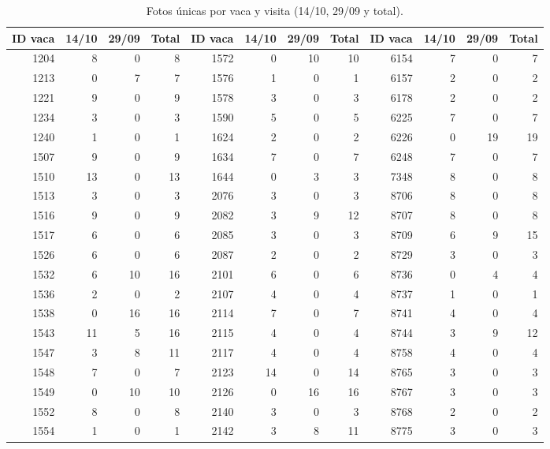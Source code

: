 \begin{table}[H]
  \centering
  \small
  \caption{Fotos únicas por vaca y visita (14/10, 29/09 y total).}
  \label{tab:fotos-por-vaca}
  \setlength{\tabcolsep}{4pt}
  \begin{tabular}{rrrr@{\hspace{1.5em}}rrrr@{\hspace{1.5em}}rrrr}
    \toprule
    ID vaca & 14/10 & 29/09 & Total & ID vaca & 14/10 & 29/09 & Total & ID vaca & 14/10 & 29/09 & Total \\
    \midrule
    1204 & 8 & 0 & 8 & 1572 & 0 & 10 & 10 & 6154 & 7 & 0 & 7 \\
    1213 & 0 & 7 & 7 & 1576 & 1 & 0 & 1 & 6157 & 2 & 0 & 2 \\
    1221 & 9 & 0 & 9 & 1578 & 3 & 0 & 3 & 6178 & 2 & 0 & 2 \\
    1234 & 3 & 0 & 3 & 1590 & 5 & 0 & 5 & 6225 & 7 & 0 & 7 \\
    1240 & 1 & 0 & 1 & 1624 & 2 & 0 & 2 & 6226 & 0 & 19 & 19 \\
    1507 & 9 & 0 & 9 & 1634 & 7 & 0 & 7 & 6248 & 7 & 0 & 7 \\
    1510 & 13 & 0 & 13 & 1644 & 0 & 3 & 3 & 7348 & 8 & 0 & 8 \\
    1513 & 3 & 0 & 3 & 2076 & 3 & 0 & 3 & 8706 & 8 & 0 & 8 \\
    1516 & 9 & 0 & 9 & 2082 & 3 & 9 & 12 & 8707 & 8 & 0 & 8 \\
    1517 & 6 & 0 & 6 & 2085 & 3 & 0 & 3 & 8709 & 6 & 9 & 15 \\
    1526 & 6 & 0 & 6 & 2087 & 2 & 0 & 2 & 8729 & 3 & 0 & 3 \\
    1532 & 6 & 10 & 16 & 2101 & 6 & 0 & 6 & 8736 & 0 & 4 & 4 \\
    1536 & 2 & 0 & 2 & 2107 & 4 & 0 & 4 & 8737 & 1 & 0 & 1 \\
    1538 & 0 & 16 & 16 & 2114 & 7 & 0 & 7 & 8741 & 4 & 0 & 4 \\
    1543 & 11 & 5 & 16 & 2115 & 4 & 0 & 4 & 8744 & 3 & 9 & 12 \\
    1547 & 3 & 8 & 11 & 2117 & 4 & 0 & 4 & 8758 & 4 & 0 & 4 \\
    1548 & 7 & 0 & 7 & 2123 & 14 & 0 & 14 & 8765 & 3 & 0 & 3 \\
    1549 & 0 & 10 & 10 & 2126 & 0 & 16 & 16 & 8767 & 3 & 0 & 3 \\
    1552 & 8 & 0 & 8 & 2140 & 3 & 0 & 3 & 8768 & 2 & 0 & 2 \\
    1554 & 1 & 0 & 1 & 2142 & 3 & 8 & 11 & 8775 & 3 & 0 & 3 \\

\end{tabular}
\end{table}
